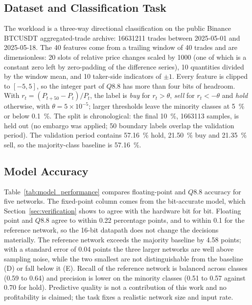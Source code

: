 \documentclass[final,5p,times,twocolumn]{elsarticle}
\begin{document}
\subsection{Dataset and Classification Task}
\label{sec:dataset}
The workload is a three-way directional classification on the public Binance
BTCUSDT aggregated-trade archive: \num{16631211} trades between 2025-05-01 and
2025-05-18. The 40 features come from a trailing window of 40 trades and are
dimensionless: 20 slots of relative price changes scaled by \num{1000} (one of
which is a constant zero left by zero-padding of the difference series), 10
quantities divided by the window mean, and 10 taker-side indicators of $\pm 1$.
Every feature is clipped to $[-5,5]$, so the integer part of $Q8.8$ has more
than four bits of headroom. With $r_t = (P_{t+50}-P_t)/P_t$, the label is
\emph{buy} for $r_t > \theta$, \emph{sell} for $r_t < -\theta$ and \emph{hold}
otherwise, with $\theta = 5\times10^{-5}$; larger thresholds leave the minority
classes at \SI{5}{\percent} or below \SI{0.1}{\percent}. The split is
chronological: the final \SI{10}{\percent}, \num{1663113} samples, is held out
(no embargo was applied; 50 boundary labels overlap the validation period). The
validation period contains \SI{57.16}{\percent} hold, \SI{21.50}{\percent} buy
and \SI{21.35}{\percent} sell, so the majority-class baseline is
\SI{57.16}{\percent}.

\subsection{Model Accuracy}
Table~\ref{tab:model_performance} compares floating-point and $Q8.8$ accuracy
for five networks. The fixed-point column comes from the bit-accurate model,
which Section~\ref{sec:verification} shows to agree with the hardware bit for
bit. Floating point and $Q8.8$ agree to within 0.22 percentage points, and to
within 0.1 for the reference network, so the 16-bit datapath does not change
the decisions materially. The reference network exceeds the majority baseline
by 4.58 points; with a standard error of 0.04 points the three larger networks
are well above sampling noise, while the two smallest are not distinguishable
from the baseline (D) or fall below it (E). Recall of the reference network is
balanced across classes (0.59 to 0.64) and precision is lower on the minority
classes (0.51 to 0.57 against 0.70 for hold). Predictive quality is not a
contribution of this work and no profitability is claimed; the task fixes a
realistic network size and input rate.
\end{document}
